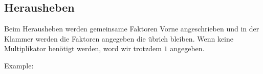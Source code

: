 \subsection{Herausheben}

Beim Herausheben werden gemeinsame Faktoren Vorne angeschrieben und in der Klammer werden die Faktoren angegeben die übrich bleiben.
Wenn keine Multiplikator benötigt werden, word wir trotzdem $1$ angegeben.

\hfill \break
Example:\\
\fboxrule=0.8pt 
